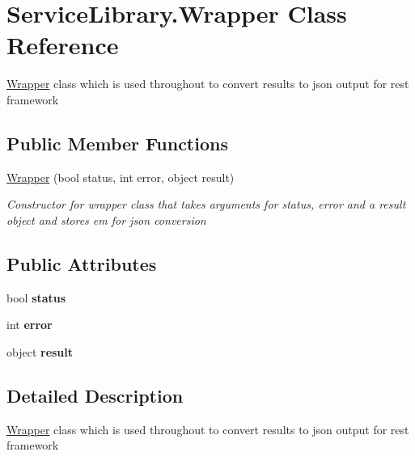 \hypertarget{class_service_library_1_1_wrapper}{\section{Service\-Library.\-Wrapper Class Reference}
\label{class_service_library_1_1_wrapper}
}


\hyperlink{class_service_library_1_1_wrapper}{Wrapper} class which is used throughout to convert results to json output for rest framework  


\subsection*{Public Member Functions}
\begin{DoxyCompactItemize}
\item 
\hyperlink{class_service_library_1_1_wrapper_a35f8fdd47eed46a3a7d9516dc6a3dad2}{Wrapper} (bool status, int error, object result)
\begin{DoxyCompactList}\small\item\em Constructor for wrapper class that takes arguments for status, error and a result object and stores em for json conversion \end{DoxyCompactList}\end{DoxyCompactItemize}
\subsection*{Public Attributes}
\begin{DoxyCompactItemize}
\item 
\hypertarget{class_service_library_1_1_wrapper_aba7e22c3fabf7eb85d4164db17ec1951}{bool {\bfseries status}}\label{class_service_library_1_1_wrapper_aba7e22c3fabf7eb85d4164db17ec1951}

\item 
\hypertarget{class_service_library_1_1_wrapper_aba5ee7390703678e89487fc857912012}{int {\bfseries error}}\label{class_service_library_1_1_wrapper_aba5ee7390703678e89487fc857912012}

\item 
\hypertarget{class_service_library_1_1_wrapper_a0eb86c8cc6c490e0f3c8c4fb4c2eaa2a}{object {\bfseries result}}\label{class_service_library_1_1_wrapper_a0eb86c8cc6c490e0f3c8c4fb4c2eaa2a}

\end{DoxyCompactItemize}


\subsection{Detailed Description}
\hyperlink{class_service_library_1_1_wrapper}{Wrapper} class which is used throughout to convert results to json output for rest framework 



